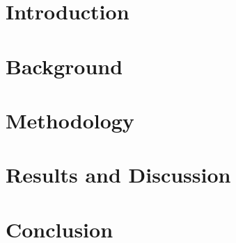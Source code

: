 \documentclass[a4paper,12pt,twoside,openright]{book}
\begin{document}
\chapter{Introduction}
\label{ch:introduction}

\clearpage

\chapter{Background}
\label{ch:background}

\clearpage

\chapter{Methodology}
\label{ch:methodology}

\clearpage

\chapter{Results and Discussion}
\label{ch:results_and_discussion}

\clearpage

\chapter{Conclusion}
\label{ch:conclusion}

\clearpage

\nocite{*}



 

\begin{appendices}
	\label{ch:appendices}
	
\end{appendices}
\end{document}
